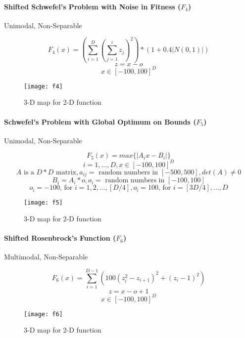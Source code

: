 \paragraph{Shifted Schwefel’s Problem with Noise in Fitness ($F_4$)} Unimodal, Non-Separable

\begin{minipage}{.5\textwidth}
\[
  F_4(x)=(\sum_{i=1}^{D}{(\sum_{j=1}^{i}{z_j})^2})*(1+0.4|N(0,1)|)
\]
\[ z=x-o \]
\[ x \in [-100,100]^D \]
\end{minipage}%
\begin{minipage}{.5\textwidth}
  \begin{figure}[H]
    \centering
    \texttt{[image: f4]}
    \caption{3-D map for 2-D function}
    \label{f4}
  \end{figure}
\end{minipage}


\paragraph{Schwefel’s Problem with Global Optimum on Bounds ($F_5$)} Unimodal, Non-Separable

\begin{minipage}{.5\textwidth}
\[
  F_5(x)=max\{|A_ix-B_i|\}
\]
\[ i=1,...,D, x \in [-100,100]^D \]
\[ A \text{ is a } D*D \text{ matrix}, a_{ij} = \text{ random numbers in } [-500,500],  det(A) \neq 0 \]
\[ B_i = A_i * o, o_i = \text{ random numbers in } [-100,100] \]
\[ o_i = -100 \text{, for } i=1,2,...,[D/4], o_i = 100 \text{, for } i=[3D/4],...,D \]
\end{minipage}%
\begin{minipage}{.5\textwidth}
  \begin{figure}[H]
    \centering
    \texttt{[image: f5]}
    \caption{3-D map for 2-D function}
    \label{f5}
  \end{figure}
\end{minipage}


\paragraph{Shifted Rosenbrock’s Function ($F_6$)} Multimodal, Non-Separable

\begin{minipage}{.5\textwidth}
\[
  F_6(x)=\sum_{i=1}^{D-1}{(100(z_i^2 - z_{i+1})^2 + (z_i - 1)^2)}
\]
\[ z=x-o+1 \]
\[ x \in [-100,100]^D \]
\end{minipage}%
\begin{minipage}{.5\textwidth}
  \begin{figure}[H]
    \centering
    \texttt{[image: f6]}
    \caption{3-D map for 2-D function}
    \label{f6}
  \end{figure}
\end{minipage}


